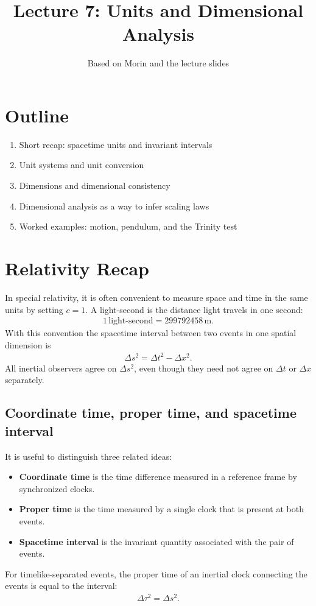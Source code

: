 \documentclass[12pt]{article}
\title{\textbf{Lecture 7: Units and Dimensional Analysis}}
\author{Based on Morin and the lecture slides}
\date{}
\newcommand{\be}{\begin{eqnarray}}
\newcommand{\ee}{\end{eqnarray}}
\begin{document}
\maketitle

\section*{Outline}
\begin{enumerate}
    \item Short recap: spacetime units and invariant intervals
    \item Unit systems and unit conversion
    \item Dimensions and dimensional consistency
    \item Dimensional analysis as a way to infer scaling laws
    \item Worked examples: motion, pendulum, and the Trinity test
\end{enumerate}

\section{Relativity Recap}
In special relativity, it is often convenient to measure space and time in the same units by setting $c=1$. A light-second is the distance light travels in one second:
\be
1\,\mathrm{light\text{-}second} = 299792458\,\mathrm{m}.
\ee
With this convention the spacetime interval between two events in one spatial dimension is
\be
\Delta s^2 = \Delta t^2 - \Delta x^2.
\ee
All inertial observers agree on $\Delta s^2$, even though they need not agree on $\Delta t$ or $\Delta x$ separately.

\subsection{Coordinate time, proper time, and spacetime interval}
It is useful to distinguish three related ideas:
\begin{itemize}
    \item \textbf{Coordinate time} is the time difference measured in a reference frame by synchronized clocks.
    \item \textbf{Proper time} is the time measured by a single clock that is present at both events.
    \item \textbf{Spacetime interval} is the invariant quantity associated with the pair of events.
\end{itemize}
For timelike-separated events, the proper time of an inertial clock connecting the events is equal to the interval:
\be
\Delta \tau^2 = \Delta s^2.
\ee
\end{document}
